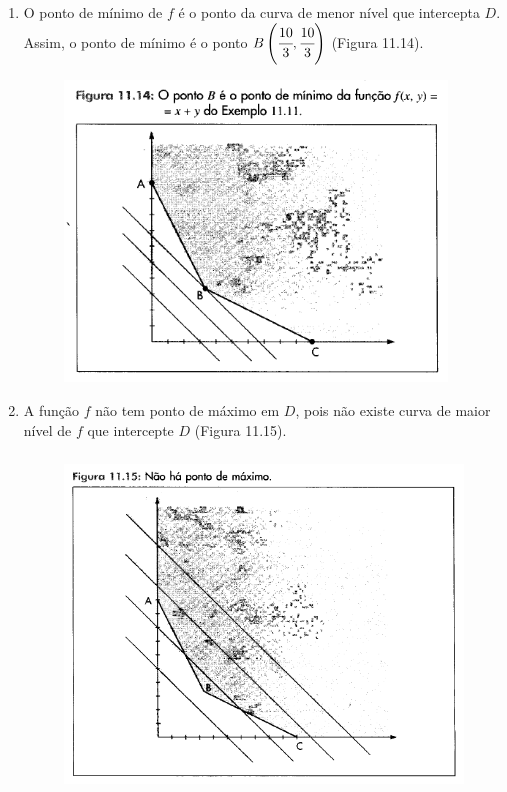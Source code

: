 \begin{enumerate}[label=\alph*)]
			\item O ponto de mínimo de $f$ é o ponto da curva de menor nível que intercepta $D$. Assim, o ponto de mínimo é o ponto $B\left( \cfrac{10}{3}, \cfrac{10}{3} \right)$ (Figura 11.14).

			\begin{figure}[H]
				\includegraphics[height=8cm]{images/morettin_figura-11-14}
			\end{figure}

			\item A função $f$ não tem ponto de máximo em $D$, pois não existe curva de maior nível de $f$ que intercepte $D$ (Figura 11.15).

			\begin{figure}[H]
				\includegraphics[height=9cm]{images/morettin_figura-11-15}
			\end{figure}

		\end{enumerate}

